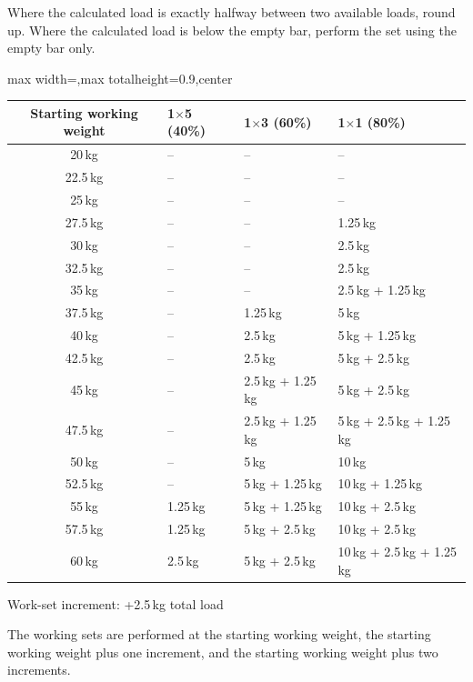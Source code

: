 \documentclass[11pt,a4paper]{article}
\newcommand{\tablearraystretch}{1.15}
\begin{document}
Where the calculated load is exactly halfway between two available loads, round up. Where the calculated load is below the empty bar, perform the set using the empty bar only.

\begin{center}
\renewcommand{\arraystretch}{\tablearraystretch}
\begin{adjustbox}{max width=\linewidth,max totalheight=0.9\textheight,center}
\begin{tabular}{c p{4cm} p{4cm} p{4cm}}
\toprule
Starting working weight &
1$\times$5 (40\%) &
1$\times$3 (60\%) &
1$\times$1 (80\%) \\
\midrule
20\,kg   & -- & -- & -- \\
22.5\,kg & -- & -- & -- \\
25\,kg   & -- & -- & -- \\
27.5\,kg & -- & -- & 1.25\,kg \\
30\,kg   & -- & -- & 2.5\,kg \\
32.5\,kg & -- & -- & 2.5\,kg \\
35\,kg   & -- & -- & 2.5\,kg + 1.25\,kg \\
37.5\,kg & -- & 1.25\,kg & 5\,kg \\
40\,kg   & -- & 2.5\,kg & 5\,kg + 1.25\,kg \\
42.5\,kg & -- & 2.5\,kg & 5\,kg + 2.5\,kg \\
45\,kg   & -- & 2.5\,kg + 1.25\,kg & 5\,kg + 2.5\,kg \\
47.5\,kg & -- & 2.5\,kg + 1.25\,kg & 5\,kg + 2.5\,kg + 1.25\,kg \\
50\,kg   & -- & 5\,kg & 10\,kg \\
52.5\,kg & -- & 5\,kg + 1.25\,kg & 10\,kg + 1.25\,kg \\
55\,kg   & 1.25\,kg & 5\,kg + 1.25\,kg & 10\,kg + 2.5\,kg \\
57.5\,kg & 1.25\,kg & 5\,kg + 2.5\,kg & 10\,kg + 2.5\,kg \\
60\,kg   & 2.5\,kg & 5\,kg + 2.5\,kg & 10\,kg + 2.5\,kg + 1.25\,kg \\
\bottomrule
\end{tabular}
\end{adjustbox}
\renewcommand{\arraystretch}{1}
\end{center}

Work-set increment: +2.5\,kg total load

The working sets are performed at the starting working weight, the starting working weight plus one increment, and the starting working weight plus two increments.
\end{document}
